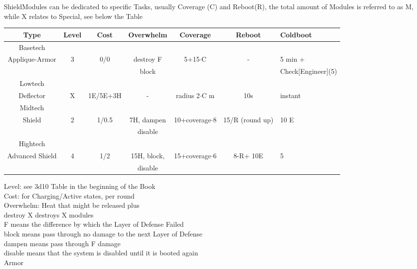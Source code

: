 \documentclass{article}
\newcommand\tab[1][1cm]{\hspace*{#1}}
\begin{document}
    ShieldModules can be dedicated to specific Tasks, usually
    Coverage (C) and Reboot(R), the total amount of Modules is referred to as M, while
    X relates to Special, see below the Table\newline
    \begin{tabular}{c|cccccl}
        Type & Level & Cost & Overwhelm & Coverage & Reboot & Coldboot \\
        \hline Basetech\\
        Applique-Armor & 3 & 0/0 & destroy F& 5+15\(\cdot\)C & -  & 5 min + \\
        &&&block&&& Check[Engineer](5) \\
        \hline Lowtech\\
        Deflector & X & 1E/5E+3H & - & radius 2\(\cdot\)C m & 10s & instant \\
        \hline Midtech\\
        Shield & 2 & 1/0.5 & 7H, dampen & 10+coverage\(\cdot\)8 & 15/R (round up) & 10 E \\
        & & & disable\\
        \hline Hightech\\
        Advanced Shield & 4 & 1/2 & 15H, block,& 15+coverage\(\cdot\)6 & 8-R+ 10E & 5 \\
        &&& disable\\
    \end{tabular}\newline\newline\newline
    Level: see 3d10 Table in the beginning of the Book\\
    Cost: for Charging/Active states, per round\\
    Overwhelm: Heat that might be released plus \\
    \tab destroy X destroys X modules\\
    \tab F means the difference by which the Layer of Defense Failed\\
    \tab block means pass through no damage to the next Layer of Defense\\
    \tab dampen means pass through F damage\\
    \tab disable means that the system is disabled until it is booted again\\
    \newline
    Armor\newline
\end{document}
